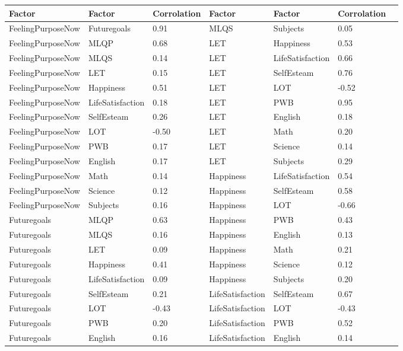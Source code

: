 \documentclass{article}\usepackage[]{graphicx}\usepackage[]{color}
\begin{document}
\begin{table}[!]
\centering
\begin{tabular}{lllllll}
  \hline
Factor & Factor & Corrolation & Factor & Factor & Corrolation \\ 
  \hline
FeelingPurposeNow & Futuregoals & 0.91 & MLQS & Subjects & 0.05 \\ 
FeelingPurposeNow & MLQP & 0.68 & LET & Happiness & 0.53 \\ 
FeelingPurposeNow & MLQS & 0.14 & LET & LifeSatisfaction & 0.66 \\ 
FeelingPurposeNow & LET & 0.15 & LET & SelfEsteam & 0.76 \\ 
FeelingPurposeNow & Happiness & 0.51 & LET & LOT & -0.52 \\ 
FeelingPurposeNow & LifeSatisfaction & 0.18 & LET & PWB & 0.95 \\ 
FeelingPurposeNow & SelfEsteam & 0.26 & LET & English & 0.18 \\ 
FeelingPurposeNow & LOT & -0.50 & LET & Math & 0.20 \\ 
FeelingPurposeNow & PWB & 0.17 & LET & Science & 0.14 \\ 
FeelingPurposeNow & English & 0.17 & LET & Subjects & 0.29 \\ 
FeelingPurposeNow & Math & 0.14 & Happiness & LifeSatisfaction & 0.54 \\ 
FeelingPurposeNow & Science & 0.12 & Happiness & SelfEsteam & 0.58 \\ 
FeelingPurposeNow & Subjects & 0.16 & Happiness & LOT & -0.66 \\ 
Futuregoals & MLQP & 0.63 & Happiness & PWB & 0.43 \\ 
Futuregoals & MLQS & 0.16 & Happiness & English & 0.13 \\ 
Futuregoals & LET & 0.09 & Happiness & Math & 0.21 \\ 
Futuregoals & Happiness & 0.41 & Happiness & Science & 0.12 \\ 
Futuregoals & LifeSatisfaction & 0.09 & Happiness & Subjects & 0.20 \\ 
Futuregoals & SelfEsteam & 0.21 & LifeSatisfaction & SelfEsteam & 0.67 \\ 
Futuregoals & LOT & -0.43 & LifeSatisfaction & LOT & -0.43 \\ 
Futuregoals & PWB & 0.20 & LifeSatisfaction & PWB & 0.52 \\ 
Futuregoals & English & 0.16 & LifeSatisfaction & English & 0.14 \\ 

\end{tabular}
\end{table}
\end{document}
